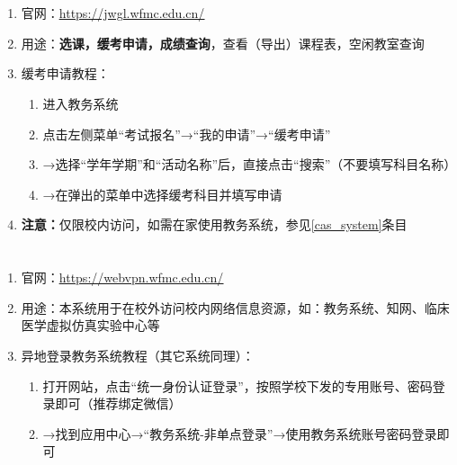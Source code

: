 \section[教务系统]{\textbf{}}
\begin{enumerate}
    \item 官网：\uline{\href{https://jwgl.wfmc.edu.cn/}{https://jwgl.wfmc.edu.cn/}}
    \item 用途：\textbf{选课，缓考申请，成绩查询}，查看（导出）课程表，空闲教室查询
    \item 缓考申请教程：
          \begin{enumerate}
              \item 进入教务系统
              \item 点击左侧菜单“考试报名”→“我的申请”→“缓考申请”
              \item →选择“学年学期”和“活动名称”后，直接点击“搜索”（不要填写科目名称）
              \item →在弹出的菜单中选择缓考科目并填写申请\footnotemark
          \end{enumerate}
    \item \textbf{注意：}仅限校内访问，如需在家使用教务系统，参见\uline{\ref{cas_system}}条目
\end{enumerate}

\section[资源访问控制系统]{\textbf{}\footnotemark}
\label{cas_system}
\begin{enumerate}
    \item 官网：\uline{\href{https://webvpn.wfmc.edu.cn/}{https://webvpn.wfmc.edu.cn/}}
    \item 用途：本系统用于在校外访问校内网络信息资源，如：教务系统、知网、临床医学虚拟仿真实验中心\footnotemark 等
    \item 异地登录教务系统教程（其它系统同理）：
          \begin{enumerate}
              \item 打开网站，点击“统一身份认证登录”，按照学校下发的专用账号、密码登录即可（推荐绑定微信）
              \item →找到应用中心→“教务系统-非单点登录”\footnotemark →使用教务系统账号密码登录即可
          \end{enumerate}
\end{enumerate}

